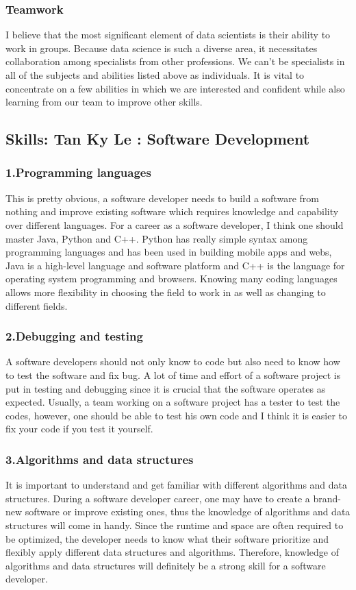 \documentclass[a4paper, 11pt]{report}
\begin{document}
    \subsubsection{Teamwork}
    I believe that the most significant element of data scientists is their ability to work in groups. Because data science is such a diverse area, it necessitates collaboration among specialists from other professions. We can't be specialists in all of the subjects and abilities listed above as individuals. It is vital to concentrate on a few abilities in which we are interested and confident while also learning from our team to improve other skills.

\subsection{Skills: Tan Ky Le : Software Development}

\subsubsection{1.Programming languages}
	This is pretty obvious, a software developer needs to build a software from nothing and improve existing software which requires knowledge and capability over different languages. For a career as a software developer, I think one should master Java, Python and C++. Python has really simple syntax among programming languages and has been used in building mobile apps and webs, Java is a high-level language and software platform and C++ is the language for operating system programming and browsers\cite{ky1}. Knowing many coding languages allows more flexibility in choosing the field to work in as well as changing to different fields.
	\subsubsection{2.Debugging and testing}
	A software developers should not only know to code but also need to know how to test the software and fix bug. A lot of time and effort of a software project is put in testing and debugging since it is crucial that the software operates as expected. Usually, a team working on a software project has a tester to test the codes, however, one should be able to test his own code and I think it is easier to fix your code if you test it yourself. 
	\subsubsection{3.Algorithms and data structures}
	It is important to understand and get familiar with different algorithms and data structures. During a software developer career, one may have to create a brand-new software or improve existing ones, thus the knowledge of algorithms and data structures will come in handy. Since the runtime and space are often required to be optimized, the developer needs to know what their software prioritize and flexibly apply different data structures and algorithms. Therefore, knowledge of algorithms and data structures will definitely be a strong skill for a software developer.
\end{document}
